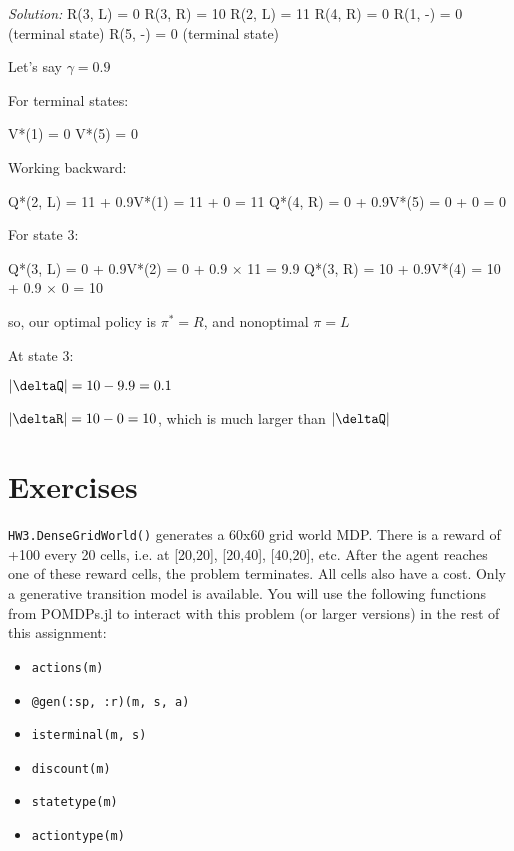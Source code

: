 \documentclass{article}
\theoremstyle{definition}
\newenvironment{solution}{\noindent\textit{Solution:}}{}
\begin{document}
\begin{solution}
    R(3, L) = 0
    R(3, R) = 10
    R(2, L) = 11
    R(4, R) = 0
    R(1, -) = 0 (terminal state)
    R(5, -) = 0 (terminal state)

    Let's say $\gamma=0.9$

    For terminal states:

    V*(1) = 0   
    V*(5) = 0

    Working backward:

    Q*(2, L) = 11 + 0.9V*(1) = 11 + 0 = 11
    Q*(4, R) = 0 + 0.9V*(5) = 0 + 0 = 0

    For state 3:

    Q*(3, L) = 0 + 0.9V*(2) = 0 + 0.9 × 11 = 9.9
    Q*(3, R) = 10 + 0.9V*(4) = 10 + 0.9 × 0 = 10

    so, our optimal policy is $\pi^{\ast}=R$, and nonoptimal $\pi=L$

    At state 3: 
    
    $|\deltaQ| = 10 - 9.9 = 0.1$ 
    
    $|\deltaR| = 10 - 0 = 10$, which is much larger than  $|\deltaQ|$
\end{solution}

\section{Exercises}
    \texttt{HW3.DenseGridWorld()} generates a 60x60 grid world MDP. There is a reward of +100 every 20 cells, i.e. at [20,20], [20,40], [40,20], etc. After the agent reaches one of these reward cells, the problem terminates. All cells also have a cost. Only a generative transition model is available. You will use the following functions from POMDPs.jl to interact with this problem (or larger versions) in the rest of this assignment:
    \begin{itemize}[nosep]
        \item \texttt{actions(m)}
        \item \texttt{@gen(:sp, :r)(m, s, a)}
        \item \texttt{isterminal(m, s)}
        \item \texttt{discount(m)}
        \item \texttt{statetype(m)}
        \item \texttt{actiontype(m)}
    \end{itemize}
\end{document}
